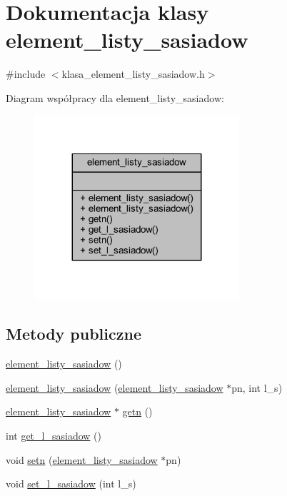 \hypertarget{classelement__listy__sasiadow}{}\section{Dokumentacja klasy element\+\_\+listy\+\_\+sasiadow}
\label{classelement__listy__sasiadow}


{\ttfamily \#include $<$klasa\+\_\+element\+\_\+listy\+\_\+sasiadow.\+h$>$}



Diagram współpracy dla element\+\_\+listy\+\_\+sasiadow\+:
\nopagebreak
\begin{figure}[H]
\begin{center}
\leavevmode
\includegraphics[width=215pt]{classelement__listy__sasiadow__coll__graph}
\end{center}
\end{figure}
\subsection*{Metody publiczne}
\begin{DoxyCompactItemize}
\item 
\mbox{\hyperlink{classelement__listy__sasiadow_a600405f729beac4281f6c2c4e762dd94}{element\+\_\+listy\+\_\+sasiadow}} ()
\item 
\mbox{\hyperlink{classelement__listy__sasiadow_af6e34737050f2737637b2451ed26375d}{element\+\_\+listy\+\_\+sasiadow}} (\mbox{\hyperlink{classelement__listy__sasiadow}{element\+\_\+listy\+\_\+sasiadow}} $\ast$pn, int l\+\_\+s)
\item 
\mbox{\hyperlink{classelement__listy__sasiadow}{element\+\_\+listy\+\_\+sasiadow}} $\ast$ \mbox{\hyperlink{classelement__listy__sasiadow_a2c1eabc63e606d142bcf66c648b0e9d0}{getn}} ()
\item 
int \mbox{\hyperlink{classelement__listy__sasiadow_ac55cdbf69f59c40f2003827b71b8d702}{get\+\_\+l\+\_\+sasiadow}} ()
\item 
void \mbox{\hyperlink{classelement__listy__sasiadow_a13c6144a9053a0c8ba1aac2a3ca8a575}{setn}} (\mbox{\hyperlink{classelement__listy__sasiadow}{element\+\_\+listy\+\_\+sasiadow}} $\ast$pn)
\item 
void \mbox{\hyperlink{classelement__listy__sasiadow_a98ac4971a69b17a96fb7689abb5e1b58}{set\+\_\+l\+\_\+sasiadow}} (int l\+\_\+s)
\end{DoxyCompactItemize}


